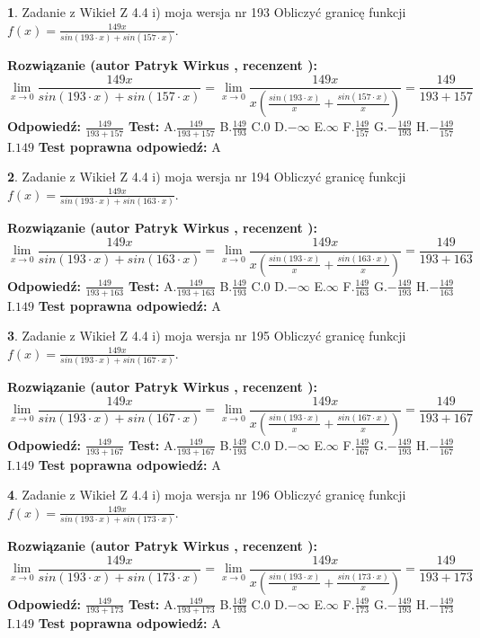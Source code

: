 \documentclass[12pt, a4paper]{article}
\theoremstyle{definition} %
\newtheorem{zad}{}
\newcommand{\zadStart}[1]{\begin{zad}#1\newline}
\newcommand{\zadStop}{\end{zad}}
\newcommand{\rozwStart}[2]{\noindent \textbf{Rozwiązanie (autor #1 , recenzent #2): }\newline}
\newcommand{\rozwStop}{\newline}
\newcommand{\odpStart}{\noindent \textbf{Odpowiedź:}\newline}
\newcommand{\odpStop}{\newline}
\newcommand{\testStart}{\noindent \textbf{Test:}\newline}
\newcommand{\testStop}{\newline}
\newcommand{\kluczStart}{\noindent \textbf{Test poprawna odpowiedź:}\newline}
\newcommand{\kluczStop}{\newline}
\begin{document}
\zadStart{Zadanie z Wikieł Z 4.4 i) moja wersja nr 193}
Obliczyć granicę funkcji $f(x)=\frac{149x}{sin(193\cdot x) +sin(157\cdot x)}$.
\zadStop
\rozwStart{Patryk Wirkus}{}
$$\lim\limits_{x\to 0}\frac{149x}{sin(193\cdot x) +sin(157\cdot x)}=\lim\limits_{x\to 0}\frac{149x}{x(\frac{sin(193\cdot x)}{x}+\frac{sin(157\cdot x)}{x})}=\frac{149}{193+157}$$
\rozwStop
\odpStart
$\frac{149}{193+157}$
\odpStop
\testStart
A.$\frac{149}{193+157}$
B.$\frac{149}{193}$
C.$0$
D.$-\infty$
E.$\infty$
F.$\frac{149}{157}$
G.$-\frac{149}{193}$
H.$-\frac{149}{157}$
I.$149$
\testStop
\kluczStart
A
\kluczStop



\zadStart{Zadanie z Wikieł Z 4.4 i) moja wersja nr 194}
Obliczyć granicę funkcji $f(x)=\frac{149x}{sin(193\cdot x) +sin(163\cdot x)}$.
\zadStop
\rozwStart{Patryk Wirkus}{}
$$\lim\limits_{x\to 0}\frac{149x}{sin(193\cdot x) +sin(163\cdot x)}=\lim\limits_{x\to 0}\frac{149x}{x(\frac{sin(193\cdot x)}{x}+\frac{sin(163\cdot x)}{x})}=\frac{149}{193+163}$$
\rozwStop
\odpStart
$\frac{149}{193+163}$
\odpStop
\testStart
A.$\frac{149}{193+163}$
B.$\frac{149}{193}$
C.$0$
D.$-\infty$
E.$\infty$
F.$\frac{149}{163}$
G.$-\frac{149}{193}$
H.$-\frac{149}{163}$
I.$149$
\testStop
\kluczStart
A
\kluczStop



\zadStart{Zadanie z Wikieł Z 4.4 i) moja wersja nr 195}
Obliczyć granicę funkcji $f(x)=\frac{149x}{sin(193\cdot x) +sin(167\cdot x)}$.
\zadStop
\rozwStart{Patryk Wirkus}{}
$$\lim\limits_{x\to 0}\frac{149x}{sin(193\cdot x) +sin(167\cdot x)}=\lim\limits_{x\to 0}\frac{149x}{x(\frac{sin(193\cdot x)}{x}+\frac{sin(167\cdot x)}{x})}=\frac{149}{193+167}$$
\rozwStop
\odpStart
$\frac{149}{193+167}$
\odpStop
\testStart
A.$\frac{149}{193+167}$
B.$\frac{149}{193}$
C.$0$
D.$-\infty$
E.$\infty$
F.$\frac{149}{167}$
G.$-\frac{149}{193}$
H.$-\frac{149}{167}$
I.$149$
\testStop
\kluczStart
A
\kluczStop



\zadStart{Zadanie z Wikieł Z 4.4 i) moja wersja nr 196}
Obliczyć granicę funkcji $f(x)=\frac{149x}{sin(193\cdot x) +sin(173\cdot x)}$.
\zadStop
\rozwStart{Patryk Wirkus}{}
$$\lim\limits_{x\to 0}\frac{149x}{sin(193\cdot x) +sin(173\cdot x)}=\lim\limits_{x\to 0}\frac{149x}{x(\frac{sin(193\cdot x)}{x}+\frac{sin(173\cdot x)}{x})}=\frac{149}{193+173}$$
\rozwStop
\odpStart
$\frac{149}{193+173}$
\odpStop
\testStart
A.$\frac{149}{193+173}$
B.$\frac{149}{193}$
C.$0$
D.$-\infty$
E.$\infty$
F.$\frac{149}{173}$
G.$-\frac{149}{193}$
H.$-\frac{149}{173}$
I.$149$
\testStop
\kluczStart
A
\kluczStop
\end{document}
